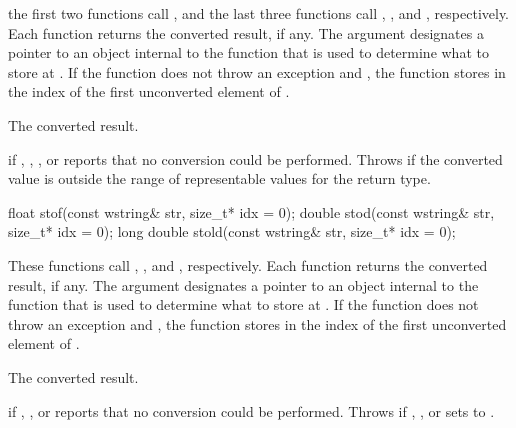 \begin{itemdescr}
\pnum
\effects the first two functions call ,
and the last three functions call ,
, and , respectively. Each function returns the converted result, if any. The
argument  designates a pointer to an object internal to the function
that is used to determine what to store at . If the function does
not throw an exception and , the function stores in 
the index of the first unconverted element of .

\pnum
\returns The converted result.

\pnum
\throws {} if , , , or
 reports that no conversion could be performed. Throws
 if the converted value is outside the range of representable values
for the return type.
\end{itemdescr}

%
%
%
\begin{itemdecl}
float stof(const wstring& str, size_t* idx = 0);
double stod(const wstring& str, size_t* idx = 0);
long double stold(const wstring& str, size_t* idx = 0);
\end{itemdecl}

\begin{itemdescr}
\pnum
\effects These functions call ,
, and ,
respectively. Each function returns the converted
result, if any. The argument  designates a pointer to an object internal to
the function that is used to determine what to store at . If the function
does not throw an exception and , the function stores in 
the index of the first unconverted element of .

\pnum
\returns The converted result.

\pnum
\throws {} if , , or  reports that no
conversion could be performed. Throws  if , , or
 sets  to .
\end{itemdescr}

